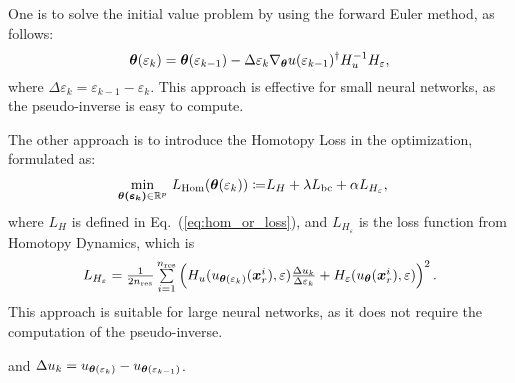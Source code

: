One is to solve the initial value problem by using the forward Euler method, as follows:
\begin{equation}
{\boldsymbol{\theta}}(\varepsilon_k) = 
          {\boldsymbol{\theta}}(\varepsilon_{k-1})-\Delta \varepsilon_k\nabla_{{\boldsymbol{\theta}}}u(\varepsilon_{k-1})^{\dagger}H_u^{-1}H_{\varepsilon},
\end{equation}
where $\Delta \varepsilon_k = \varepsilon_{k-1}-\varepsilon_{k}$. This approach is effective for small neural networks, as the pseudo-inverse is easy to compute.

The other approach is to introduce the Homotopy Loss in the optimization, formulated as:
\begin{align}
\underset{\boldsymbol{{\boldsymbol{\theta}}({\varepsilon_k})} \in \mathbb{R}^p}{\mbox{min}}~L_{\text{Hom}}(\boldsymbol{{\boldsymbol{\theta}}}({\varepsilon_k})) \coloneqq &  L_{H} +\lambda L_{\text{bc}}+\alpha L_{H_{\varepsilon}},
\end{align}
where $L_{H}$ is defined in Eq.~(\ref{eq:hom_or_loss}), and $L_{H_{\varepsilon}}$ is the loss function from Homotopy Dynamics, which is \[L_{H_{\varepsilon}} =  \textstyle\frac{1}{2n_\textup{res}}\textstyle\sum^{n_\textup{res}}\limits_{i=1}\left(H_{u}(u_{{\boldsymbol{\theta}}({\varepsilon_k})}(\boldsymbol{x}_r^i),\varepsilon)\frac{\Delta u_k}{\Delta \varepsilon_k} + H_{\varepsilon}(u_{\boldsymbol{\theta}}(\boldsymbol{x}_r^i),\varepsilon)\right)^2.\]
This approach is suitable for large neural networks, as it does not require the computation of the pseudo-inverse.






and $\Delta u_k = u_{{\boldsymbol{\theta}}({\varepsilon_k})} - u_{{\boldsymbol{\theta}}({\varepsilon_{k-1}})}$.



